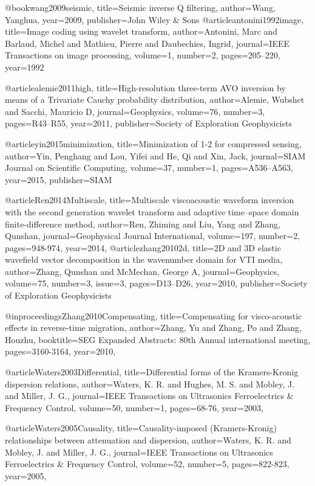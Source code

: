 @book{wang2009seismic,
  title={Seismic inverse {Q} filtering},
  author={Wang, Yanghua},
  year={2009},
  publisher={John Wiley \& Sons}
}
@article{antonini1992image,
  title={Image coding using wavelet transform},
  author={Antonini, Marc and Barlaud, Michel and Mathieu, Pierre and Daubechies, Ingrid},
  journal={IEEE Transactions on image processing},
  volume={1},
  number={2},
  pages={205--220},
  year={1992}
}

@article{alemie2011high,
  title={High-resolution three-term AVO inversion by means of a Trivariate Cauchy probability distribution},
  author={Alemie, Wubshet and Sacchi, Mauricio D},
  journal={Geophysics},
  volume={76},
  number={3},
  pages={R43--R55},
  year={2011},
  publisher={Society of Exploration Geophysicists}
}

@article{yin2015minimization,
  title={Minimization of 1-2 for compressed sensing},
  author={Yin, Penghang and Lou, Yifei and He, Qi and Xin, Jack},
  journal={SIAM Journal on Scientific Computing},
  volume={37},
  number={1},
  pages={A536--A563},
  year={2015},
  publisher={SIAM}
}

@article{Ren2014Multiscale,
  title={Multiscale viscoacoustic waveform inversion with the second generation wavelet transform and adaptive time–space domain finite-difference method},
  author={Ren, Zhiming and Liu, Yang and Zhang, Qunshan},
  journal={Geophysical Journal International},
  volume={197},
  number={2},
  pages={948-974},
  year={2014},
}
@article{zhang20102d,
  title={2D and 3D elastic wavefield vector decomposition in the wavenumber domain for VTI media},
  author={Zhang, Qunshan and McMechan, George A},
  journal={Geophysics},
  volume={75},
  number={3},
  issue=3,
  pages={D13--D26},
  year={2010},
  publisher={Society of Exploration Geophysicists}
}

@inproceedings{Zhang2010Compensating,
  title={Compensating for visco-acoustic effects in reverse-time migration},
  author={Zhang, Yu and Zhang, Po and Zhang, Houzhu},
  booktitle={SEG Expanded Abstracts: 80th Annual international meeting},
  pages={3160-3164},
  year={2010},
}

@article{Waters2003Differential,
  title={Differential forms of the Kramers-Kronig dispersion relations},
  author={Waters, K. R. and Hughes, M. S. and Mobley, J. and Miller, J. G.},
  journal={IEEE Transactions on Ultrasonics Ferroelectrics \& Frequency Control},
  volume={50},
  number={1},
  pages={68-76},
  year={2003},
}

@article{Waters2005Causality,
  title={Causality-imposed (Kramers-Kronig) relationships between attenuation and dispersion},
  author={Waters, K. R. and Mobley, J. and Miller, J. G.},
  journal={IEEE Transactions on Ultrasonics Ferroelectrics \& Frequency Control},
  volume={52},
  number={5},
  pages={822-823},
  year={2005},
}

